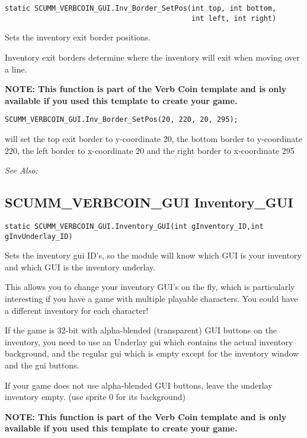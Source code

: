 \begin{verbatim}
static SCUMM_VERBCOIN_GUI.Inv_Border_SetPos(int top, int bottom,
                                            int left, int right)
\end{verbatim}
Sets the inventory exit border positions.

Inventory exit borders determine where the inventory will exit when moving over a line.

\bf{NOTE:} This function is part of the Verb Coin template and is only available if
you used this template to create your game.

\begin{verbatim}
SCUMM_VERBCOIN_GUI.Inv_Border_SetPos(20, 220, 20, 295);
\end{verbatim}

will set the top exit border to y-coordinate 20, the bottom border to y-coordinate 220,
the left border to x-coordinate 20 and the right border to x-coordinate 295

\it{See Also:} 


\subsection{SCUMM_VERBCOIN_GUI Inventory_GUI}\label{SCUMM_VERBCOIN_GUI.Inventory_GUI}%

\begin{verbatim}
static SCUMM_VERBCOIN_GUI.Inventory_GUI(int gInventory_ID,int gInvUnderlay_ID)
\end{verbatim}
Sets the inventory gui ID's, so the module will know which GUI is your
inventory and which GUI is the inventory underlay.

This allows you to change your inventory GUI's on the fly, which is particularly
interesting if you have a game with multiple playable characters. You could have
a different inventory for each character!

If the game is 32-bit with alpha-blended (transparent) GUI buttons on the
inventory, you need to use an Underlay gui which contains the actual inventory
background, and the regular gui which is empty except for the inventory window
and the gui buttons.

If your game does not use alpha-blended GUI buttons, leave the underlay inventory
empty. (use sprite 0 for its background)

\bf{NOTE:} This function is part of the Verb Coin template and is only available if
you used this template to create your game.

